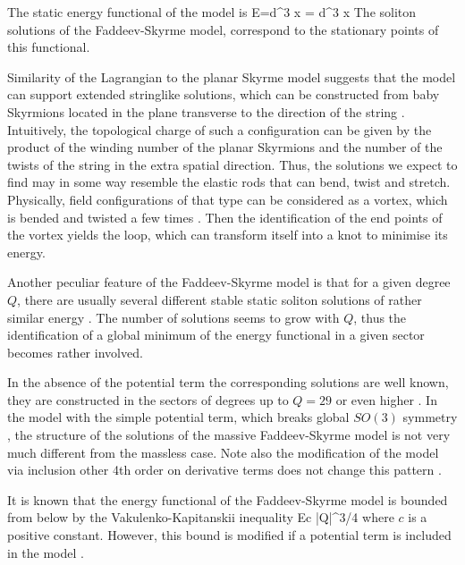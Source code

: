 \documentclass[12pt,a4paper]{article}
\begin{document}
The static energy functional of the  model  is
\be\label{hopfenergy}
E=\int d^3 x  = \int d^3 x
\ee
The soliton solutions of the Faddeev-Skyrme model,  correspond to the stationary points of this  functional.

Similarity of the Lagrangian  to the planar Skyrme model \cite{BB,Bsk}
suggests that the model can support
extended stringlike solutions, which can be constructed from baby Skyrmions located in the plane transverse to
the direction of the string \cite{Kobayashi:2013xoa}. Intuitively, the topological charge of such a configuration can be given
by the product
of the winding number of the planar Skyrmions and the number of the twists of the string in the extra spatial direction.
Thus, the solutions we expect to find may in some way resemble the elastic rods that can bend, twist and  stretch. Physically, field
configurations of that type can be considered as a vortex, which is bended  and twisted a few times \cite{Harland:2010wc}. Then the
identification of the end points of the vortex yields the loop, which can transform itself into a knot to minimise its energy.


Another peculiar feature of the Faddeev-Skyrme model is that
for a given degree $Q$, there are usually several different stable static soliton solutions of rather
similar energy \cite{Sutcliffe:2007ui}. The number of solutions seems to grow with $Q$, thus the identification of a global minimum of the
energy functional in a given sector becomes rather involved.


In the absence of the potential term the corresponding solutions are well known, they are constructed in the sectors of degrees up
to $Q=29$ or even higher \cite{Sutcliffe:2007ui,Jennings:2014mca}. In the model with the simple
potential term, which breaks global $SO(3)$ symmetry \cite{Kundu:1982bc,Foster:2010zb,Harland:2013uk,Battye:2013xf}, the structure of the
solutions of the massive Faddeev-Skyrme model is not very much different from the massless case. Note also the modification
of the model via inclusion other 4th order on derivative terms does not change this pattern \cite{Gladikowski:1996mb}.

It is known that the energy functional of the  Faddeev-Skyrme model is bounded from
below by the Vakulenko-Kapitanskii inequality \cite{Vakulenko:1979uw}
\be
E\ge c |Q|^{3/4}
\label{VK-bound}
\ee
where $c$ is a positive constant. However, this bound is modified if  a potential term is included in the model
\cite{Harland:2013rxa}.
\end{document}
